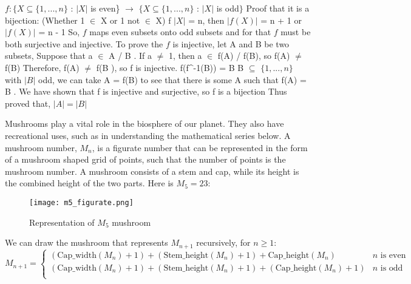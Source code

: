 \documentclass[addpoints]{exam}
\begin{document}
\begin{questions}
  \begin{solution}
   $f : \{X \subseteq \{1,..., n\}$ : $|X|$ is even\} $\rightarrow$  $\{X \subseteq \{1, ..., n\}$ : $|X|$ is odd$\}$ \newline
    Proof that it is a bijection: \newline
    (Whether 1 $\in$ X or 1 not $\in $ X) \newline
    f $|X|$ = n, then $|f(X)|$ = n + 1 or $|f(X)|$ = n - 1 \newline
    So, $f$ maps even subsets onto odd subsets and for that $f$ must be both surjective and injective. \newline
    To prove the $f$ is injective, let A and B be two subsets, \newline 
    Suppose that a $\in$ A / B . If  a $\neq$ 1, then \newline
    a $\in$ f(A) / f(B), so f(A) $\neq$ f(B) \newline
    Therefore,\newline 
    f(A) $\neq$ f(B ), so f is injective.\newline
    f(f^{-1}(B)) = B   \newline
    B $\subseteq$ $\{1, . . . , n\}$ with $|B |$ odd, we can take A = f(B) to see that there is some A such that f(A) = B .  \newline
    We have shown that f is injective and surjective, so f is a bijection   \newline
    Thus proved that, \newline
    $|A|=|B|$
  \end{solution}
  
\question Mushrooms play a vital role in the biosphere of our planet. They also have recreational uses, such as in understanding the mathematical series below. A mushroom number, $M_n$, is a figurate number that can be represented in the form of a mushroom shaped grid of points, such that the number of points is the mushroom number. A mushroom consists of a stem and cap, while its height is the combined height of the two parts. Here is $M_5=23$:

\begin{figure}[h]
  \centering
  \texttt{[image: m5\_figurate.png]}
  \caption{Representation of $M_5$ mushroom}
  \label{fig:mushroom_anatomy}
\end{figure}

We can draw the mushroom that represents $M_{n+1}$ recursively, for $n \geq 1$:
\[ 
    M_{n+1}=
    \begin{cases} 
      (\textrm{Cap\_width}(M_n) + 1) + (\textrm{Stem\_height}(M_n) + 1) + \textrm{Cap\_height}(M_n)  & n \textrm{ is even} \\
      (\textrm{Cap\_width}(M_n) + 1) + (\textrm{Stem\_height}(M_n) + 1)  + (\textrm{Cap\_height}(M_n)+1) & n \textrm{ is odd}  \\      
   \end{cases}
\]


\end{questions}
\end{document}
